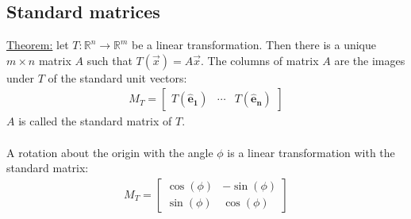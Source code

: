 \documentclass[11pt, a4paper]{article}
\begin{document}
\subsection{Standard matrices}
\underline{Theorem:}
let $T: \mathbb{R}^n \rightarrow \mathbb{R}^m$ be a linear transformation. Then there is a unique $m \times n$ matrix $A$ such that
$T(\vec{x}) = A\vec{x}$. The columns of matrix $A$ are the images under $T$ of the standard unit vectors:
\begin{align*}
  M_T = 
  \begin{bmatrix} T(\boldsymbol{\hat{e}_1}) & \cdots & T(\boldsymbol{\hat{e}_n}) \end{bmatrix}
\end{align*}
$A$ is called the standard matrix of $T$.\\
\\
A rotation about the origin with the angle $\phi$ is a linear transformation with the standard matrix:
\begin{align*}
  M_T = 
  \begin{bmatrix}
    \cos(\phi) & -\sin(\phi)\\
    \sin(\phi) & \cos(\phi)
  \end{bmatrix}
\end{align*}
\end{document}
